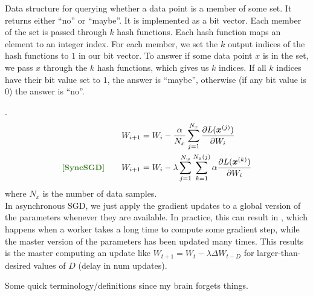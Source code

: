 \documentclass[11pt]{article}
\begin{document}
\myspace
{}
\myspace

Data structure for querying whether a data point is a member of some set. It returns either ``no'' or ``maybe''. It is implemented as a bit vector. Each member of the set is passed through $k$ hash functions. Each hash function maps an element to an integer index. For each member, we set the $k$ output indices of the hash functions to $1$ in our bit vector. To answer if some data point $x$ is in the set, we pass $x$ through the $k$ hash functions, which gives us $k$ indices. If all $k$ indices have their bit value set to $1$, the answer is ``maybe'', otherwise (if any bit value is 0) the answer is ``no''.



\myspace
{}
\myspace

\p {}. 
\begin{align}
	W_{i+1}
		&= W_i - \frac{\alpha}{N_x} \sum_{j = 1}^{N_x} \pderiv{L(\vec{x}^{(j)})}{W_i} \\
	\mtgreen{[SyncSGD]} \qquad W_{i + 1} 
		&= W_i - \lambda \sum_{j = 1}^{N_w} \sum_{k = 1}^{N_x(j)} \alpha \pderiv{L(\vec{x}^{(k)})}{W_i} 
\end{align}
where $N_x$ is the number of data samples.   \\

In asynchronous SGD, we just apply the gradient updates to a global version of the parameters whenever they are available. In practice, this can result in , which happens when a worker takes a long time to compute some gradient step, while the master version of the parameters has been updated many times. This results is the master computing an update like $W_{t + 1} = W_t - \lambda \Delta W_{t - D}$ for larger-than-desired values of $D$ (delay in num updates). 



\myspace
{}
\myspace

Some quick terminology/definitions since my brain forgets things. 
\end{document}
